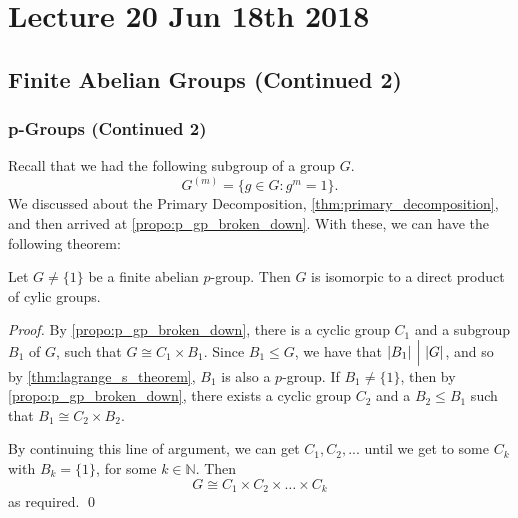\chapter{Lecture 20 Jun 18th 2018}%
\label{chp:lecture_20_jun_18th_2018}

\section{Finite Abelian Groups (Continued 2)}%
\label{sec:finite_abelian_groups_continued_2}

\subsection{p-Groups (Continued 2)}%
\label{sub:p_groups_continued_2}

Recall that we had the following subgroup of a group $G$.
\begin{equation*}
  G^{(m)} = \{ g \in G : g^m = 1 \}.
\end{equation*}
We discussed about the Primary Decomposition, \cref{thm:primary_decomposition}, and then arrived at \cref{propo:p_gp_broken_down}. With these, we can have the following theorem:

\begin{thm}
\label{thm:finite_abelian_groups_are_isomorphic_to_a_direct_product_of_cyclic_groups}
Let $G \neq \{1\}$ be a finite abelian $p$-group. Then $G$ is isomorpic to a direct product of cylic groups.
\end{thm}

\begin{proof}
  By \cref{propo:p_gp_broken_down}, there is a cyclic group $C_1$ and a subgroup $B_1$ of $G$, such that $G \cong C_1 \times B_1$. Since $B_1 \leq G$, we have that $\left|B_1\right| \, \Big| \, \left|G\right|$, and so by \cref{thm:lagrange_s_theorem}, $B_1$ is also a $p$-group. If $B_1 \neq \{1\}$, then by \cref{propo:p_gp_broken_down}, there exists a cyclic group $C_2$ and a $B_2 \leq B_1$ such that $B_1 \cong C_2 \times B_2$.

  By continuing this line of argument, we can get $C_1, C_2, ...$ until we get to some $C_k$ with $B_k = \{1\}$, for some $k \in \mathbb{N}$. Then
  \begin{equation*}
    G \cong C_1 \times C_2 \times \hdots \times C_k
  \end{equation*}
  as required. \qed
\end{proof}

